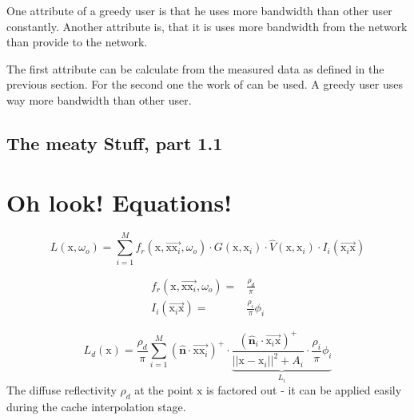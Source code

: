 \documentclass[thesis.tex]{subfiles}
\begin{document}
One attribute of a greedy user is that he uses more bandwidth than other user constantly. Another attribute is, that it is uses more bandwidth from the network than provide to the network. 

The first attribute can be calculate from the measured data as defined in the previous section. For the second one the work of  can be used. 
A greedy user uses way more bandwidth than other user. 

\subsection{The meaty Stuff, part 1.1}

\section{Oh look! Equations!}

\begin{equation}
L(\mathrm{x}, \omega_o) = \sum\limits_{i=1}^{M} f_r(\mathrm{x}, \overrightarrow{\mathrm{x}\mathrm{x}_i}, \omega_o) \cdot G(\mathrm{x}, \mathrm{x}_i) \cdot \hat{V}(\mathrm{x}, \mathrm{x}_i) \cdot I_i(\overrightarrow{\mathrm{x}_i\mathrm{x}})
\end{equation}

\begin{align}
f_r(\mathrm{x}, \overrightarrow{\mathrm{x}\mathrm{x}_i}, \omega_o) =& \frac{\rho_d}{\pi}\\
I_i(\overrightarrow{\mathrm{x}_i\mathrm{x}}) =& \frac{\rho_i}{\pi} \phi_i
\end{align}


\begin{equation} \label{eq:rsmdiffuse}
L_d (\mathrm{x}) = \frac{\rho_d}{\pi} \sum\limits_{i=1}^{M} 
(\hat{\mathbf{n}} \cdot \overrightarrow{\mathrm{x}\mathrm{x}_i} )^+ \cdot
\underbrace{\frac{(\hat{\mathbf{n}}_i\cdot \overrightarrow{\mathrm{x}_i\mathrm{x}})^+}{||\mathrm{x} - \mathrm{x}_i||^2 + A_i} \cdot  \frac{\rho_i}{\pi} \phi_i}_{L_i}
\end{equation}
The diffuse reflectivity $\rho_d$ at the point $\mathrm{x}$ is factored out - it can be applied easily during the cache interpolation stage.
\end{document}
